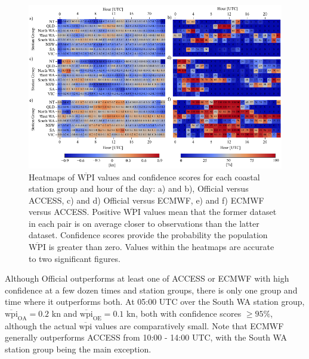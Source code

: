 \documentclass{ametsoc}
\begin{document}
\begin{figure}
\centering
\includegraphics[width=39pc]{wpi_coastal.pdf}
\caption{Heatmaps of $\overline{\text{WPI}}$ values and confidence scores for each coastal station group and hour of the day: a) and b), Official versus ACCESS, c) and d) Official versus ECMWF, e) and f) ECMWF versus ACCESS. Positive $\overline{\text{WPI}}$ values mean that the former dataset in each pair is on average closer to observations than the latter dataset. Confidence scores provide the probability the population $\overline{\text{WPI}}$ is greater than zero. Values within the heatmaps are accurate to two significant figures.}
\label{Fig:wpi_coastal}
\end{figure}

Although Official outperforms at least one of ACCESS or ECMWF with high confidence at a few dozen times and station groups, there is only one group and time where it outperforms both. At 05:00 UTC over the South WA station group, $\overline{\text{wpi}}_\text{OA} = 0.2$ kn and $\overline{\text{wpi}}_\text{OE} = 0.1$ kn, both with confidence scores $\geq 95\%$, although the actual $\overline{\text{wpi}}$ values are comparatively small. Note that ECMWF generally outperforms ACCESS from 10:00 - 14:00 UTC, with the South WA station group being the main exception.    
\end{document}
